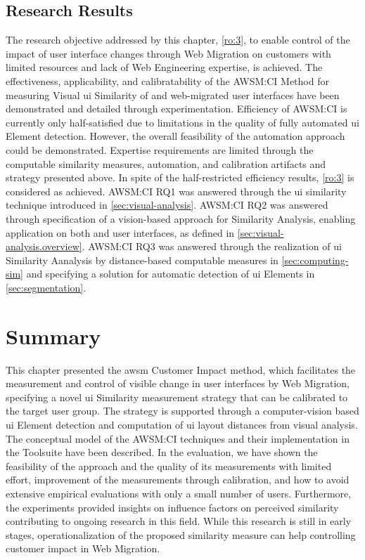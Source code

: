 \vspace{-10pt}
\hypertarget{sec:ci.evaluation.objective}{%
\subsection{Research Results}\label{sec:ci.evaluation.objective}}
\vspace{10pt}

The research objective addressed by this chapter, \cref{ro:3}, to enable control of the impact of user interface changes through \gls{Web Migration} on customers with limited resources and lack of \gls{Web Engineering} expertise, is achieved.
The effectiveness, applicability, and calibratability of the AWSM:CI Method for measuring Visual \gls{ui} Similarity of \legacy and \gls{web}-migrated user interfaces have been demonstrated and detailed through experimentation.
Efficiency of AWSM:CI is currently only half-satisfied due to limitations in the quality of fully automated \gls{ui} Element detection.
However, the overall feasibility of the automation approach could be demonstrated.
Expertise requirements are limited through the computable similarity measures, automation, and calibration artifacts and strategy presented above.
In spite of the half-restricted efficiency results, \cref{ro:3} is considered as achieved.
AWSM:CI RQ1 was answered through the \gls{ui} similarity technique introduced in \cref{sec:visual-analysis}.
AWSM:CI RQ2 was answered through specification of a vision-based approach for Similarity Analysis, enabling application on both \legacy and \webbased user interfaces, as defined in \cref{sec:visual-analysis.overview}.
AWSM:CI RQ3 was answered through the realization of \gls{ui} Similarity Aanalysis by distance-based computable measures in \cref{sec:computing-sim} and specifying a solution for automatic detection of \gls{ui} Elements in \cref{sec:segmentation}.

\hypertarget{sec:ci.summary}{%
\section{Summary}\label{sec:ci.summary}}
\vspace{15pt}

This chapter presented the \gls{awsm} Customer Impact method, which facilitates the measurement and control of visible change in user interfaces by \gls{Web Migration}, specifying a novel \gls{ui} Similarity measurement strategy that can be calibrated to the target user group.
The strategy is supported through a computer-vision based \gls{ui} Element detection and computation of \gls{ui} layout distances from visual analysis.
The conceptual model of the AWSM:CI techniques and their implementation in the Toolsuite have been described.
In the evaluation, we have shown the feasibility of the approach and the quality of its measurements with limited effort, improvement of the measurements through calibration, and how to avoid extensive empirical evaluations with only a small number of users.
Furthermore, the experiments provided insights on influence factors on perceived similarity contributing to ongoing research in this field.
While this research is still in early stages, operationalization of the proposed similarity measure can help controlling customer impact in \gls{Web Migration}.
